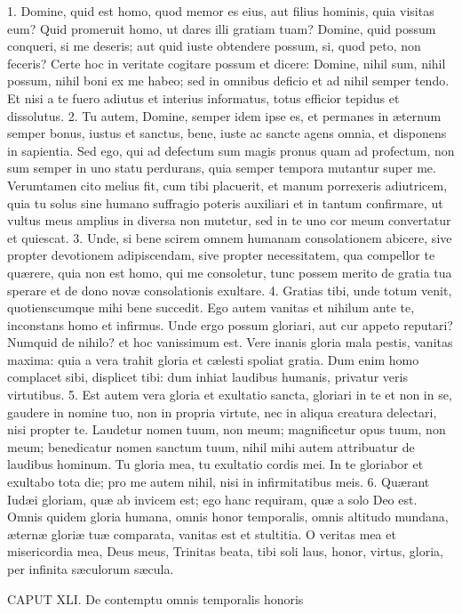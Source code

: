 \documentclass[twoside]{article}
\begin{document}
1. Domine, quid est homo, quod memor es eius, aut filius hominis, quia visitas eum? Quid promeruit homo, ut dares illi gratiam tuam? Domine, quid possum conqueri, si me deseris; aut quid iuste obtendere possum, si, quod peto, non feceris? Certe hoc in veritate cogitare possum et dicere: Domine, nihil sum, nihil possum, nihil boni ex me habeo; sed in omnibus deficio et ad nihil semper tendo. Et nisi a te fuero adiutus et interius informatus, totus efficior tepidus et dissolutus.
2. Tu autem, Domine, semper idem ipse es, et permanes in æternum semper bonus, iustus et sanctus, bene, iuste ac sancte agens omnia, et disponens in sapientia. Sed ego, qui ad defectum sum magis pronus quam ad profectum, non sum semper in uno statu perdurans, quia semper tempora mutantur super me. Verumtamen cito melius fit, cum tibi placuerit, et manum porrexeris adiutricem, quia tu solus sine humano suffragio poteris auxiliari et in tantum confirmare, ut vultus meus amplius in diversa non mutetur, sed in te uno cor meum convertatur et quiescat.
3. Unde, si bene scirem omnem humanam consolationem abicere, sive propter devotionem adipiscendam, sive propter necessitatem, qua compellor te quærere, quia non est homo, qui me consoletur, tunc possem merito de gratia tua sperare et de dono novæ consolationis exultare.
4. Gratias tibi, unde totum venit, quotienscumque mihi bene succedit. Ego autem vanitas et nihilum ante te, inconstans homo et infirmus. Unde ergo possum gloriari, aut cur appeto reputari? Numquid de nihilo? et hoc vanissimum est. Vere inanis gloria mala pestis, vanitas maxima: quia a vera trahit gloria et cælesti spoliat gratia. Dum enim homo complacet sibi, displicet tibi: dum inhiat laudibus humanis, privatur veris virtutibus.
5. Est autem vera gloria et exultatio sancta, gloriari in te et non in se, gaudere in nomine tuo, non in propria virtute, nec in aliqua creatura delectari, nisi propter te. Laudetur nomen tuum, non meum; magnificetur opus tuum, non meum; benedicatur nomen sanctum tuum, nihil mihi autem attribuatur de laudibus hominum. Tu gloria mea, tu exultatio cordis mei. In te gloriabor et exultabo tota die; pro me autem nihil, nisi in infirmitatibus meis.
6. Quærant Iudæi gloriam, quæ ab invicem est; ego hanc requiram, quæ a solo Deo est. Omnis quidem gloria humana, omnis honor temporalis, omnis altitudo mundana, æternæ gloriæ tuæ comparata, vanitas est et stultitia. O veritas mea et misericordia mea, Deus meus, Trinitas beata, tibi soli laus, honor, virtus, gloria, per infinita sæculorum sæcula.


CAPUT XLI.
De contemptu omnis temporalis honoris
\end{document}
